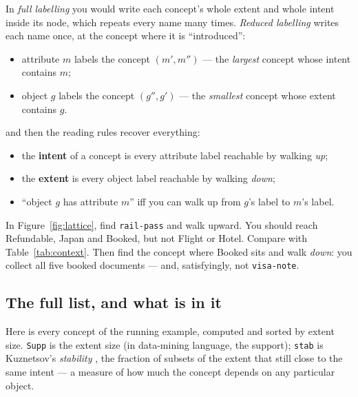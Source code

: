 In \emph{full labelling} you would write each concept's whole extent and whole
intent inside its node, which repeats every name many times. \emph{Reduced
labelling} writes each name once, at the concept where it is ``introduced'':

\begin{itemize}[leftmargin=1.4em]
\item attribute $m$ labels the concept $(m', m'')$ --- the \emph{largest}
  concept whose intent contains $m$;
\item object $g$ labels the concept $(g'', g')$ --- the \emph{smallest}
  concept whose extent contains $g$.
\end{itemize}

\noindent and then the reading rules recover everything:

\begin{itemize}[leftmargin=1.4em]
\item the \textbf{intent} of a concept is every attribute label reachable by
  walking \emph{up};
\item the \textbf{extent} is every object label reachable by walking
  \emph{down};
\item ``object $g$ has attribute $m$'' iff you can walk up from $g$'s label
  to $m$'s label.
\end{itemize}

\begin{tryit}
In Figure~\ref{fig:lattice}, find \texttt{rail-pass} and walk upward. You
should reach \textsf{Refundable}, \textsf{Japan} and \textsf{Booked}, but not
\textsf{Flight} or \textsf{Hotel}. Compare with Table~\ref{tab:context}. Then
find the concept where \textsf{Booked} sits and walk \emph{down}: you collect
all five booked documents --- and, satisfyingly, not \texttt{visa-note}.
\end{tryit}

\subsection{The full list, and what is in it}

Here is every concept of the running example, computed and sorted by extent
size. \texttt{Supp} is the extent size (in data-mining language, the support);
\texttt{stab} is Kuznetsov's \emph{stability} \citep{kuznetsov2007}, the
fraction of subsets of the extent that still close to the same intent --- a
measure of how much the concept depends on any particular object.

